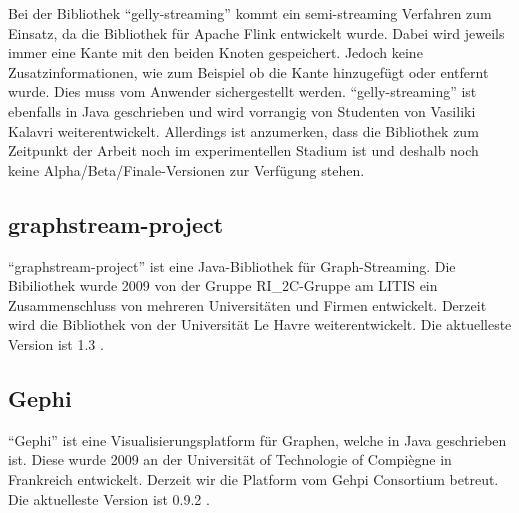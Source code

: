 Bei der Bibliothek \enquote{gelly-streaming} kommt ein semi-streaming Verfahren
zum Einsatz, da die Bibliothek für Apache Flink entwickelt wurde. Dabei wird
jeweils immer eine Kante mit den beiden Knoten gespeichert. Jedoch keine
Zusatzinformationen, wie zum Beispiel ob die Kante hinzugefügt oder entfernt
wurde. Dies muss vom Anwender sichergestellt werden. \enquote{gelly-streaming}
ist ebenfalls in Java geschrieben und wird vorrangig von Studenten von
Vasiliki Kalavri weiterentwickelt. Allerdings ist anzumerken, dass die Bibliothek
zum Zeitpunkt der Arbeit noch im experimentellen Stadium ist und deshalb noch
keine Alpha/Beta/Finale-Versionen zur Verfügung stehen.


\subsection{graphstream-project}
\enquote{graphstream-project} ist eine Java-Bibliothek für Graph-Streaming. Die
Bibiliothek wurde 2009 von der Gruppe RI_{2}C-Gruppe am LITIS ein Zusammenschluss
von mehreren Universitäten und Firmen entwickelt. Derzeit wird die Bibliothek von
der Universität Le Havre weiterentwickelt. Die aktuelleste Version ist 1.3 .



\subsection{Gephi}
\enquote{Gephi} ist eine Visualisierungsplatform für Graphen, welche in Java
geschrieben ist. Diese wurde 2009 an der Universität of Technologie of Compiègne
in Frankreich entwickelt. Derzeit wir die Platform vom Gehpi Consortium betreut.
Die aktuelleste Version ist 0.9.2 .

